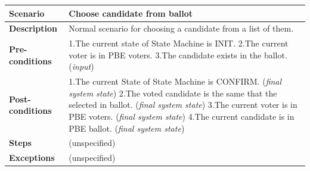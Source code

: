 \documentclass{article}
\begin{document}
\begin{center}
    \begin{tabular}{ | l | p{9cm} |}
    \hline
   \textbf{Scenario}	& \textbf{Choose candidate from ballot}  \\ \hline
    \textbf{Description}	& Normal scenario for choosing a candidate from a list of them. \\ \hline
   \textbf{Pre-conditions}	& 1.The current state of State Machine is INIT.\linebreak
2.The current voter is in PBE voters.\linebreak
3.The candidate exists in the ballot.
 (\textit{input})
\\ \hline
 \textbf{Post-conditions} &1.The current State of State Machine is CONFIRM. (\textit{final system state})\linebreak
2.The voted candidate is the same that the selected in ballot. (\textit{final system state})\linebreak
3.The current voter is in PBE voters. (\textit{final system state})\linebreak
4.The current candidate is in PBE ballot. (\textit{final system state})

   \\ \hline
   \textbf{Steps} &	(unspecified) \\ 
    \hline
\textbf{Exceptions}& 	(unspecified)
 \\ 
    \hline
    \end{tabular}
\end{center}
\end{document}

